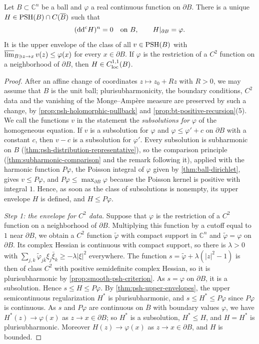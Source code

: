 \begin{theorem}\label{thm:homogeneous-ball-dirichlet}
Let $B\subset\mathbb C^n$ be a ball and $\varphi$ a real continuous function on $\partial B$. There is a unique $H\in\mathrm{PSH}(B)\cap C(\overline B)$ such that
\[
 (\mathrm{dd}^{\mathrm{c}} H)^n=0\quad\text{on }B,\qquad H|_{\partial B}=\varphi.
\]
It is the upper envelope of the class of all $v\in\mathrm{PSH}(B)$ with $\varlimsup_{B\ni z\to x}v(z)\le\varphi(x)$ for every $x\in\partial B$. If $\varphi$ is the restriction of a $C^2$ function on a neighborhood of $\partial B$, then $H\in C^{1,1}_{\mathrm{loc}}(B)$.
\end{theorem}
\begin{proof}
After an affine change of coordinates $z\mapsto z_0+Rz$ with $R>0$, we may assume that $B$ is the unit ball; plurisubharmonicity, the boundary conditions, $C^2$ data and the vanishing of the Monge--Amp\`ere measure are preserved by such a change, by \cref{prop:psh-holomorphic-pullback} and \cref{prop:bt-positive-recursion}(5). We call the functions $v$ in the statement the \emph{subsolutions for} $\varphi$ of the homogeneous equation. If $v$ is a subsolution for $\varphi$ and $\varphi\le\varphi'+c$ on $\partial B$ with a constant $c$, then $v-c$ is a subsolution for $\varphi'$. Every subsolution is subharmonic on $B$ (\cref{thm:psh-distribution-representative}), so the comparison principle (\cref{thm:subharmonic-comparison} and the remark following it), applied with the harmonic function $P\varphi$, the Poisson integral of $\varphi$ given by \cref{thm:ball-dirichlet}, gives $v\le P\varphi$, and $P\varphi\le\max_{\partial B}\varphi$ because the Poisson kernel is positive with integral $1$. Hence, as soon as the class of subsolutions is nonempty, its upper envelope $H$ is defined, and $H\le P\varphi$.

\emph{Step 1: the envelope for $C^2$ data.} Suppose that $\varphi$ is the restriction of a $C^2$ function on a neighborhood of $\partial B$. Multiplying this function by a cutoff equal to $1$ near $\partial B$, we obtain a $C^2$ function $\tilde\varphi$ with compact support in $\mathbb{C}^n$ and $\tilde\varphi=\varphi$ on $\partial B$. Its complex Hessian is continuous with compact support, so there is $\lambda>0$ with $\sum_{j,k}\tilde\varphi_{j\bar k}\xi_j\bar\xi_k\ge-\lambda|\xi|^2$ everywhere. The function $s=\tilde\varphi+\lambda(|z|^2-1)$ is then of class $C^2$ with positive semidefinite complex Hessian, so it is plurisubharmonic by \cref{prop:smooth-psh-criterion}. As $s=\varphi$ on $\partial B$, it is a subsolution. Hence $s\le H\le P\varphi$. By \cref{thm:psh-upper-envelopes}, the upper semicontinuous regularization $H^*$ is plurisubharmonic, and $s\le H^*\le P\varphi$ since $P\varphi$ is continuous. As $s$ and $P\varphi$ are continuous on $\overline B$ with boundary values $\varphi$, we have $H^*(z)\to\varphi(x)$ as $z\to x\in\partial B$; so $H^*$ is a subsolution, $H^*\le H$, and $H=H^*$ is plurisubharmonic. Moreover $H(z)\to\varphi(x)$ as $z\to x\in\partial B$, and $H$ is bounded.


\end{proof}
